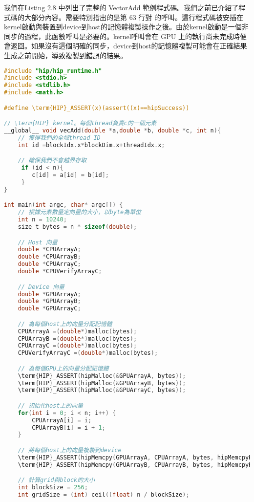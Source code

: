 我們在Listing 2.8 中列出了完整的 VectorAdd 範例程式碼。我們之前已介紹了程式碼的大部分內容。需要特別指出的是第 63 行對  的呼叫。這行程式碼被安插在kernel啟動與裝置到device到host的記憶體複製操作之後。由於kernel啟動是一個非同步的過程，此函數呼叫是必要的。kernel呼叫會在 GPU 上的執行尚未完成時便會返回。如果沒有這個明確的同步，device到host的記憶體複製可能會在正確結果生成之前開始，導致複製到錯誤的結果。

\begin{lstlisting}[language=C, caption={完整的VectorAdd範例程式碼}, label={8th:example}]
#include "hip/hip_runtime.h"
#include <stdio.h>
#include <stdlib.h>
#include <math.h>

#define \term{HIP}_ASSERT(x)(assert((x)==hipSuccess))

// \term{HIP} kernel。每個thread負責c的一個元素
__global__ void vecAdd(double *a,double *b, double *c, int n){
    // 獲得我們的全域thread ID
    int id =blockIdx.x*blockDim.x+threadIdx.x;

    // 確保我們不會越界存取
     if (id < n){
        c[id] = a[id] = b[id];
     }
}

int main(int argc, char* argc[]) {
    // 根據元素數量定向量的大小，以byte為單位
    int n = 10240;
    size_t bytes = n * sizeof(double);

    // Host 向量
    double *CPUArrayA;
    double *CPUArrayB;
    double *CPUArrayC;
    double *CPUVerifyArrayC;

    // Device 向量
    double *GPUArrayA;
    double *GPUArrayB;
    double *GPUArrayC;

    // 為每個host上的向量分配記憶體
    CPUArrayA =(double*)malloc(bytes);
    CPUArrayB =(double*)malloc(bytes);
    CPUArrayC =(double*)malloc(bytes);
    CPUVerifyArrayC =(double*)malloc(bytes);

    // 為每個GPU上的向量分配記憶體
    \term{HIP}_ASSERT(hipMalloc(&GPUArrayA, bytes));
    \term{HIP}_ASSERT(hipMalloc(&GPUArrayB, bytes));
    \term{HIP}_ASSERT(hipMalloc(&GPUArrayC, bytes));

    // 初始化host上的向量
    for(int i = 0; i < n; i++) {
        CPUArrayA[i] = i;
        CPUArrayB[i] = i + 1;
    }

    // 將每個host上的向量複製到device
    \term{HIP}_ASSERT(hipMemcpy(GPUArrayA, CPUArrayA, bytes, hipMemcpyHostToDevice));
    \term{HIP}_ASSERT(hipMemcpy(GPUArrayB, CPUArrayB, bytes, hipMemcpyHostToDevice));

    // 計算grid與block的大小
    int blockSize = 256;
    int gridSize = (int) ceil((float) n / blockSize);


\end{lstlisting}
